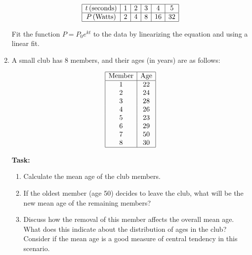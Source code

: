 \documentclass[11pt]{article}
\begin{document}
\begin{enumerate}
\[
\begin{array}{|c|c|c|c|c|c|}
\hline
t \,(\text{seconds}) & 1 & 2 & 3 & 4 & 5 \\
\hline
P \,(\text{Watts}) & 2 & 4 & 8 & 16 & 32 \\
\hline
\end{array}
\]

Fit the function \( P = P_0 e^{kt} \) to the data by linearizing the equation and using a linear fit.




\item A small club has 8 members, and their ages (in years) are as follows:

\[
\begin{array}{|c|c|}
\hline
\text{Member} & \text{Age} \\
\hline
1 & 22 \\
2 & 24 \\
3 & 28 \\
4 & 26 \\
5 & 23 \\
6 & 29 \\
7 & 50 \\
8 & 30 \\
\hline
\end{array}
\]

\textbf{Task:}
\begin{enumerate}
    \item Calculate the mean age of the club members.
    \item If the oldest member (age 50) decides to leave the club, what will be the new mean age of the remaining members?
    \item Discuss how the removal of this member affects the overall mean age. What does this indicate about the distribution of ages in the club? Consider if the mean age is a good measure of central tendency in this scenario.
\end{enumerate}



\end{enumerate}
\end{document}

